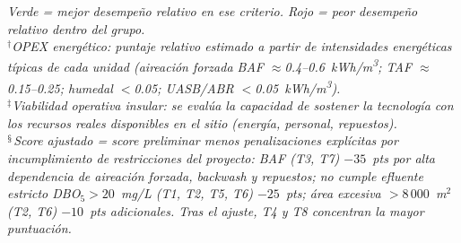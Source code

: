 \documentclass[aspectratio=169]{beamer}
\begin{document}
\begin{frame}
\vspace{4pt}
\scriptsize
\textit{Verde = mejor desempe\~{n}o relativo en ese criterio. Rojo = peor desempe\~{n}o relativo dentro del grupo.}\\
$^\dagger$\textit{OPEX energ\'{e}tico: puntaje relativo estimado a partir de intensidades energ\'{e}ticas t\'{i}picas de cada unidad (aireaci\'{o}n forzada BAF $\approx$0.4--0.6~kWh/m\textsuperscript{3}; TAF $\approx$0.15--0.25; humedal $<$0.05; UASB/ABR $<$0.05~kWh/m\textsuperscript{3}).}\\
$^\ddagger$\textit{Viabilidad operativa insular: se eval\'{u}a la capacidad de sostener la tecnolog\'{i}a con los recursos reales disponibles en el sitio (energ\'{i}a, personal, repuestos).}\\
$^\mathsection$\textit{Score ajustado = score preliminar menos penalizaciones expl\'{i}citas por incumplimiento de restricciones del proyecto: BAF (T3, T7) $-35$~pts por alta dependencia de aireaci\'{o}n forzada, backwash y repuestos; no cumple efluente estricto DBO$_5>20$~mg/L (T1, T2, T5, T6) $-25$~pts; \'{a}rea excesiva $>8\,000$~m$^2$ (T2, T6) $-10$~pts adicionales. Tras el ajuste, T4 y T8 concentran la mayor puntuaci\'{o}n.}
\end{frame}
\end{document}
